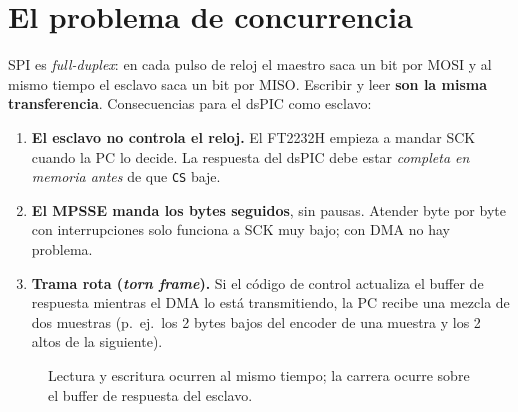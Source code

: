 \documentclass[11pt]{article}
\begin{document}
\section{El problema de concurrencia}

SPI es \emph{full-duplex}: en cada pulso de reloj el maestro saca un bit por
MOSI y al mismo tiempo el esclavo saca un bit por MISO. Escribir y leer
\textbf{son la misma transferencia}. Consecuencias para el dsPIC como esclavo:

\begin{enumerate}
  \item \textbf{El esclavo no controla el reloj.} El FT2232H empieza a mandar
        SCK cuando la PC lo decide. La respuesta del dsPIC debe estar
        \emph{completa en memoria antes} de que \texttt{CS} baje.
  \item \textbf{El MPSSE manda los bytes seguidos}, sin pausas. Atender byte por
        byte con interrupciones solo funciona a SCK muy bajo; con DMA no hay
        problema.
  \item \textbf{Trama rota (\emph{torn frame}).} Si el código de control
        actualiza el buffer de respuesta mientras el DMA lo está transmitiendo,
        la PC recibe una mezcla de dos muestras (p.\ ej.\ los 2 bytes bajos del
        encoder de una muestra y los 2 altos de la siguiente).
\end{enumerate}

\begin{figure}[H]
\centering
{}
\caption{Lectura y escritura ocurren al mismo tiempo; la carrera ocurre sobre
el buffer de respuesta del esclavo.}
\end{figure}
\end{document}

